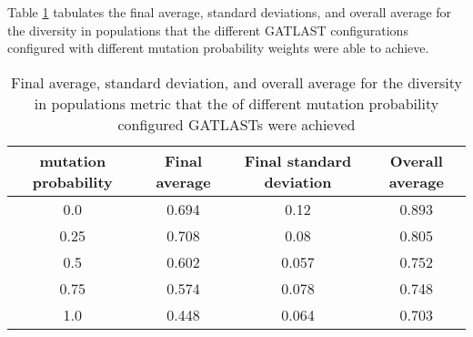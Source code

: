 Table \ref{tab:HP:GA:mutationProp:diversity in populations} tabulates the final average, standard deviations, and overall average for the diversity in populations that the different GATLAST configurations configured with different mutation probability weights were able to achieve.
\begin{table}[tbh!]
\centering
\begin{adjustbox}{trim=0cm 0cm 0cm 0cm, clip=true}
\begin{tabular}{|c|c|c|c|}
\hline
mutation probability & Final average & Final standard deviation & Overall average\\
\hline
0.0 & 0.694 & 0.12 & 0.893\\\hline
0.25 & 0.708 & 0.08 & 0.805\\\hline
0.5 & 0.602 & 0.057 & 0.752\\\hline
0.75 & 0.574 & 0.078 & 0.748\\\hline
1.0 & 0.448 & 0.064 & 0.703\\\hline
\end{tabular}
\end{adjustbox}
\caption{Final average, standard deviation, and overall average for the diversity in populations metric that the of different mutation probability configured GATLASTs were achieved}
\label{tab:HP:GA:mutationProp:diversity in populations}
\end{table}